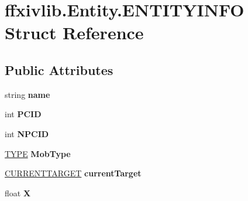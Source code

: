 \hypertarget{structffxivlib_1_1_entity_1_1_e_n_t_i_t_y_i_n_f_o}{\section{ffxivlib.\-Entity.\-E\-N\-T\-I\-T\-Y\-I\-N\-F\-O Struct Reference}
\label{structffxivlib_1_1_entity_1_1_e_n_t_i_t_y_i_n_f_o}
}
\subsection*{Public Attributes}
\begin{DoxyCompactItemize}
\item 
\hypertarget{structffxivlib_1_1_entity_1_1_e_n_t_i_t_y_i_n_f_o_afa81612dd1f40544b2bc987c0d224413}{string {\bfseries name}}\label{structffxivlib_1_1_entity_1_1_e_n_t_i_t_y_i_n_f_o_afa81612dd1f40544b2bc987c0d224413}

\item 
\hypertarget{structffxivlib_1_1_entity_1_1_e_n_t_i_t_y_i_n_f_o_af4340fb1575aed1491d220b0996277e3}{int {\bfseries P\-C\-I\-D}}\label{structffxivlib_1_1_entity_1_1_e_n_t_i_t_y_i_n_f_o_af4340fb1575aed1491d220b0996277e3}

\item 
\hypertarget{structffxivlib_1_1_entity_1_1_e_n_t_i_t_y_i_n_f_o_a201031ed99104aa84eddcacdfa0276c7}{int {\bfseries N\-P\-C\-I\-D}}\label{structffxivlib_1_1_entity_1_1_e_n_t_i_t_y_i_n_f_o_a201031ed99104aa84eddcacdfa0276c7}

\item 
\hypertarget{structffxivlib_1_1_entity_1_1_e_n_t_i_t_y_i_n_f_o_a42fd66513e50082589fa96b06b8bb5ca}{\hyperlink{namespaceffxivlib_aaa4e86d1ea6dbc1661147e6616256e68}{T\-Y\-P\-E} {\bfseries Mob\-Type}}\label{structffxivlib_1_1_entity_1_1_e_n_t_i_t_y_i_n_f_o_a42fd66513e50082589fa96b06b8bb5ca}

\item 
\hypertarget{structffxivlib_1_1_entity_1_1_e_n_t_i_t_y_i_n_f_o_ace1351810603910b7d8793c513e805ba}{\hyperlink{namespaceffxivlib_a027fd426531e3a42243f5c2b946dde31}{C\-U\-R\-R\-E\-N\-T\-T\-A\-R\-G\-E\-T} {\bfseries current\-Target}}\label{structffxivlib_1_1_entity_1_1_e_n_t_i_t_y_i_n_f_o_ace1351810603910b7d8793c513e805ba}

\item 
\hypertarget{structffxivlib_1_1_entity_1_1_e_n_t_i_t_y_i_n_f_o_a6c542f7ef80b754b74031829ece457a3}{float {\bfseries X}}\label{structffxivlib_1_1_entity_1_1_e_n_t_i_t_y_i_n_f_o_a6c542f7ef80b754b74031829ece457a3}


\end{DoxyCompactItemize}
